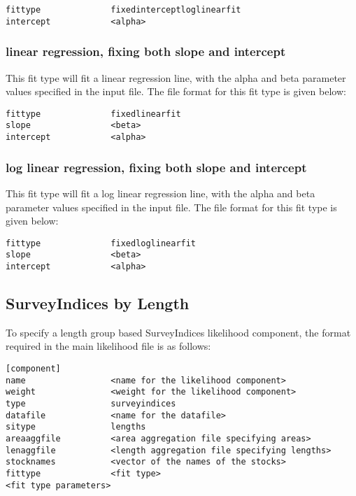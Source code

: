 \documentclass [a4paper, 10pt]{book}
\begin{document}
{\small\begin{verbatim}
fittype              fixedinterceptloglinearfit
intercept            <alpha>
\end{verbatim}}

\subsubsection{linear regression, fixing both slope and intercept}
This fit type will fit a linear regression line, with the alpha and beta parameter values specified in the input file.  The file format for this fit type is given below:

{\small\begin{verbatim}
fittype              fixedlinearfit
slope                <beta>
intercept            <alpha>
\end{verbatim}}

\subsubsection{log linear regression, fixing both slope and intercept}
This fit type will fit a log linear regression line, with the alpha and beta parameter values specified in the input file.  The file format for this fit type is given below:

{\small\begin{verbatim}
fittype              fixedloglinearfit
slope                <beta>
intercept            <alpha>
\end{verbatim}}

\subsection{SurveyIndices by Length}\label{subsec:sibylength}
To specify a length group based SurveyIndices likelihood component, the format required in the main likelihood file is as follows:

{\small\begin{verbatim}
[component]
name                 <name for the likelihood component>
weight               <weight for the likelihood component>
type                 surveyindices
datafile             <name for the datafile>
sitype               lengths
areaaggfile          <area aggregation file specifying areas>
lenaggfile           <length aggregation file specifying lengths>
stocknames           <vector of the names of the stocks>
fittype              <fit type>
<fit type parameters>
\end{verbatim}}
\end{document}
